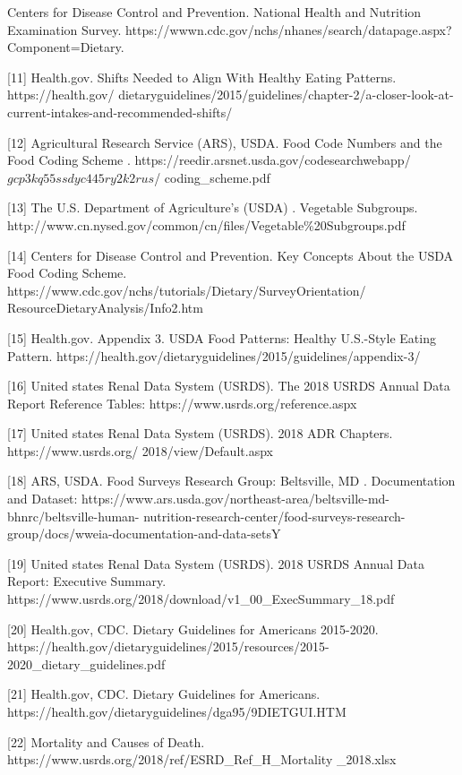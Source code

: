 \begin{flushleft}
\noindent [10]	Centers for Disease Control and Prevention. National Health and Nutrition Examination Survey. https://wwwn.cdc.gov/nchs/nhanes/search/datapage.aspx?Component=Dietary. 

[11]	Health.gov. Shifts Needed to Align With Healthy Eating Patterns. https://health.gov/
dietaryguidelines/2015/guidelines/chapter-2/a-closer-look-at-current-intakes-and-recommended-shifts/

[12]	Agricultural Research Service (ARS), USDA. Food Code Numbers and the Food Coding 
Scheme . https://reedir.arsnet.usda.gov/codesearchwebapp/\(gcp3kq55ssdyc445ry2k2rus\)/
coding\_scheme.pdf 

[13]	The U.S. Department of Agriculture’s (USDA) . Vegetable Subgroups. http://www.cn.nysed.gov/common/cn/files/Vegetable\%20Subgroups.pdf 

[14]	Centers for Disease Control and Prevention. Key Concepts About the USDA Food 
Coding Scheme. https://www.cdc.gov/nchs/tutorials/Dietary/SurveyOrientation/
ResourceDietaryAnalysis/Info2.htm 

[15]	Health.gov. Appendix 3. USDA Food Patterns: Healthy U.S.-Style Eating Pattern. https://health.gov/dietaryguidelines/2015/guidelines/appendix-3/

[16]	United states Renal Data System (USRDS). The 2018 USRDS Annual Data Report Reference Tables: https://www.usrds.org/reference.aspx

[17]	United states Renal Data System (USRDS). 2018 ADR Chapters. https://www.usrds.org/
2018/view/Default.aspx

[18]	ARS, USDA. Food Surveys Research Group: Beltsville, MD . Documentation and 
Dataset: https://www.ars.usda.gov/northeast-area/beltsville-md-bhnrc/beltsville-human-
nutrition-research-center/food-surveys-research-group/docs/wweia-documentation-and-data-setsY

[19]	United states Renal Data System (USRDS). 2018 USRDS Annual Data Report: 
Executive Summary. https://www.usrds.org/2018/download/v1\_00\_ExecSummary\_18.pdf

[20]	Health.gov, CDC. Dietary  Guidelines  for Americans  2015-2020. https://health.gov/dietaryguidelines/2015/resources/2015-2020\_dietary\_guidelines.pdf 

[21]	Health.gov, CDC. Dietary  Guidelines  for Americans. https://health.gov/dietaryguidelines/dga95/9DIETGUI.HTM

[22]	Mortality and Causes of Death. https://www.usrds.org/2018/ref/ESRD\_Ref\_H\_Mortality
\_2018.xlsx


\end{flushleft}

